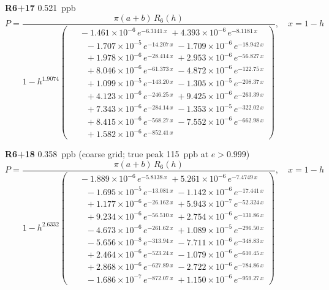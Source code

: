 \documentclass[12pt]{article}
\begin{document}
\noindent\textbf{R6+17} 0.521~ppb\nopagebreak
\begin{equation*}
P = \frac{\pi(a{+}b)\,R_6(h)}{1 - h^{1.9074}\!\left(\!\begin{aligned}
  &\; -1.461{\times}10^{-6}\,e^{-6.3141\,x} \; +4.393{\times}10^{-6}\,e^{-8.1181\,x} \\[-3pt]
  &\quad -1.707{\times}10^{-5}\,e^{-14.207\,x} \; -1.709{\times}10^{-6}\,e^{-18.942\,x} \\[-3pt]
  &\quad +1.978{\times}10^{-6}\,e^{-28.414\,x} \; +2.953{\times}10^{-6}\,e^{-56.827\,x} \\[-3pt]
  &\quad +8.046{\times}10^{-6}\,e^{-61.373\,x} \; -4.872{\times}10^{-6}\,e^{-122.75\,x} \\[-3pt]
  &\quad +1.099{\times}10^{-5}\,e^{-143.20\,x} \; -1.305{\times}10^{-5}\,e^{-208.37\,x} \\[-3pt]
  &\quad +4.123{\times}10^{-6}\,e^{-246.25\,x} \; +9.425{\times}10^{-6}\,e^{-263.39\,x} \\[-3pt]
  &\quad +7.343{\times}10^{-6}\,e^{-284.14\,x} \; -1.353{\times}10^{-5}\,e^{-322.02\,x} \\[-3pt]
  &\quad +8.415{\times}10^{-6}\,e^{-568.27\,x} \; -7.552{\times}10^{-6}\,e^{-662.98\,x} \\[-3pt]
  &\quad +1.582{\times}10^{-6}\,e^{-852.41\,x}
\end{aligned}\!\right)}, \quad x = 1{-}h
\end{equation*}

\noindent\textbf{R6+18} 0.358~ppb (coarse grid; true peak 115~ppb at $e > 0.999$)\nopagebreak
\begin{equation*}
P = \frac{\pi(a{+}b)\,R_6(h)}{1 - h^{2.6332}\!\left(\!\begin{aligned}
  &\; -1.889{\times}10^{-6}\,e^{-5.8138\,x} \; +5.261{\times}10^{-6}\,e^{-7.4749\,x} \\[-3pt]
  &\quad -1.695{\times}10^{-5}\,e^{-13.081\,x} \; -1.142{\times}10^{-6}\,e^{-17.441\,x} \\[-3pt]
  &\quad +1.177{\times}10^{-6}\,e^{-26.162\,x} \; +5.943{\times}10^{-7}\,e^{-52.324\,x} \\[-3pt]
  &\quad +9.234{\times}10^{-6}\,e^{-56.510\,x} \; +2.754{\times}10^{-6}\,e^{-131.86\,x} \\[-3pt]
  &\quad -4.673{\times}10^{-6}\,e^{-261.62\,x} \; +1.089{\times}10^{-5}\,e^{-296.50\,x} \\[-3pt]
  &\quad -5.656{\times}10^{-8}\,e^{-313.94\,x} \; -7.711{\times}10^{-6}\,e^{-348.83\,x} \\[-3pt]
  &\quad +2.464{\times}10^{-6}\,e^{-523.24\,x} \; -1.079{\times}10^{-6}\,e^{-610.45\,x} \\[-3pt]
  &\quad +2.868{\times}10^{-6}\,e^{-627.89\,x} \; -2.722{\times}10^{-6}\,e^{-784.86\,x} \\[-3pt]
  &\quad -1.686{\times}10^{-7}\,e^{-872.07\,x} \; +1.150{\times}10^{-6}\,e^{-959.27\,x}
\end{aligned}\!\right)}, \quad x = 1{-}h
\end{equation*}
\end{document}
